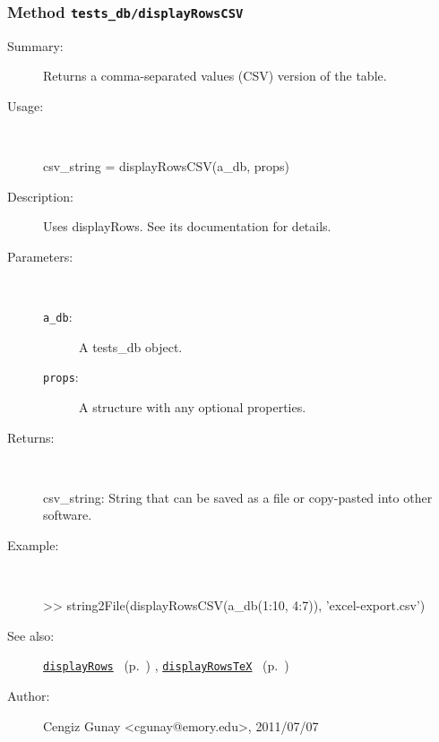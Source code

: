 \subsubsection[Method \texttt{displayRowsCSV}]{Method \texttt{tests\_db/displayRowsCSV}}%
%
\label{ref_tests_db__displayRowsCSV}%
\hypertarget{ref_tests_db__displayRowsCSV}{}%
\begin{description}
\item[Summary:]Returns a comma-separated values (CSV) version of the table.
%
\item[Usage:]~%
\begin{lyxcode}%
csv\_string = displayRowsCSV(a\_db, props)
%
\end{lyxcode}%
%
\item[Description:]%
Uses displayRows. See its documentation for details.
\item[Parameters:]~
\begin{description}%
\item[\texttt{a\_db}:]
 A tests\_db object.
\item[\texttt{props}:]
 A structure with any optional properties.
\end{description}%
%
\item[Returns:
]~

   csv\_string: String that can be saved as  a file or copy-pasted into other software.
%
\item[Example:]~
\begin{lyxcode} >> string2File(displayRowsCSV(a\_db(1:10, 4:7)), 'excel-export.csv')
\\%
\end{lyxcode}
%
\item[See also:]%
\hyperlink{ref_displayRows}{\texttt{displayRows}}%
\ (p.~\pageref{ref_displayRows})%
%
, \hyperlink{ref_displayRowsTeX}{\texttt{displayRowsTeX}}%
\ (p.~\pageref{ref_displayRowsTeX})%
%
%
\item[Author:]%
Cengiz Gunay <cgunay@emory.edu>, 2011/07/07
%
\end{description}
\methodline%
